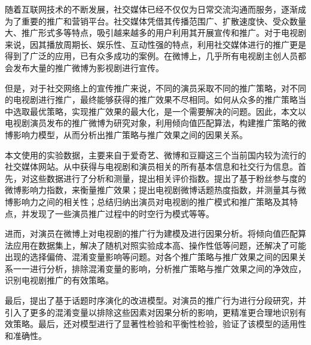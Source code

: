 \makeatletter
\ifthu@bachelor\relax\else
  \ifthu@doctor
  \else
    \ifthu@master
    \fi
  \fi
\fi
\makeatother



\begin{cabstract}

随着互联网技术的不断发展，社交媒体已经不仅仅为日常交流沟通而服务，逐渐成为了重要的推广和营销平台。社交媒体凭借其传播范围广、扩散速度快、受众数量大、推广形式多等特点，吸引越来越多的用户利用其开展宣传和推广。对于电视剧来说，因其播放周期长、娱乐性、互动性强的特点，利用社交媒体进行的推广更是得到了广泛的应用，已有众多成功的案例。在微博上，几乎所有电视剧主创人员都会发布大量的推广微博为影视剧进行宣传。

但是，对于社交网络上的宣传推广来说，不同的演员采取不同的推广策略，对不同的电视剧进行推广，最终能够获得的推广效果不尽相同。如何从众多的推广策略当中选取最优策略，实现推广效果的最大化，是一个需要解决的问题。因此，本文以电视剧演员发布的推广微博为研究对象，利用倾向值匹配算法，构建推广策略的微博影响力模型，从而分析出推广策略与推广效果之间的因果关系。

本文使用的实验数据，主要来自于爱奇艺、微博和豆瓣这三个当前国内较为流行的社交媒体网站。从中获得与电视剧和演员相关的所有基本信息和社交行为信息。首先，对这些数据进行了分析和测量，提出相关评价指数。提出了基于粉丝参与度的微博影响力指数，来衡量推广效果；提出电视剧微博话题热度指数，并测量其与微博影响力之间的相关性；总结归纳出演员对电视剧的推广模式和推广策略及其特点，并发现了一些演员推广过程中的时空行为模式等等。

进而，对演员在微博上对电视剧的推广行为建模及进行因果分析。将倾向值匹配算法应用在数据集上，解决了随机对照实验成本高、操作性低等问题，还解决了可能出现的选择偏倚、混淆变量影响等问题。对各个推广策略与推广效果之间的因果关系一一进行分析，排除混淆变量的影响，分析推广策略与推广效果之间的净效应，识别电视剧推广的有效策略。

最后，提出了基于话题时序演化的改进模型。对演员的推广行为进行分段研究，并引入了更多的混淆变量以排除这些因素对因果分析的影响，更精准更合理地识别有效策略。最后，还对模型进行了显著性检验和平衡性检验，验证了该模型的适用性和准确性。

\end{cabstract}

